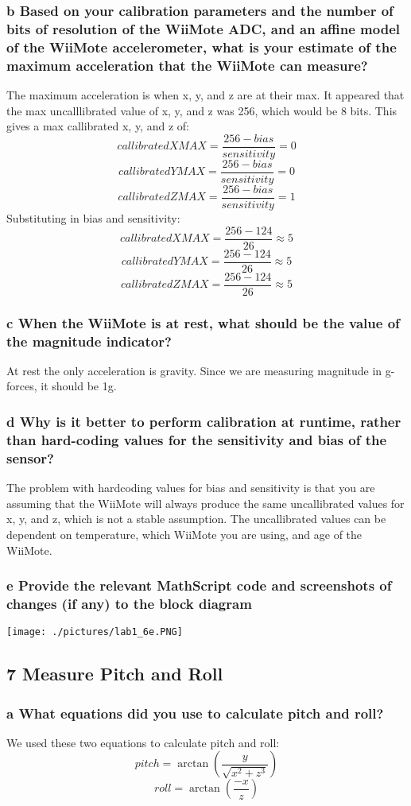 \documentclass[10pt,a4paper]{article}
\begin{document}
    \subsubsection*{b Based on your calibration parameters and the number of bits of resolution of the WiiMote ADC, and an affine model of the WiiMote accelerometer, what is your estimate of the maximum acceleration that the WiiMote can measure?}
      The maximum acceleration is when x, y, and z are at their max. It appeared that the max uncalllibrated value of x, y, and z was 256, which would be 8 bits. This gives a max callibrated x, y, and z of:
        \[callibratedXMAX = \frac{256 - bias}{sensitivity} = 0\] 
        \[callibratedYMAX = \frac{256 - bias}{sensitivity} = 0\] 
        \[callibratedZMAX = \frac{256 - bias}{sensitivity} = 1\]
      Substituting in bias and sensitivity:
        \[callibratedXMAX = \frac{256 - 124}{26} \approx 5\] 
        \[callibratedYMAX = \frac{256 - 124}{26} \approx 5\] 
        \[callibratedZMAX = \frac{256 - 124}{26} \approx 5\]
    \subsubsection*{c When the WiiMote is at rest, what should be the value of the magnitude indicator?}
      At rest the only acceleration is gravity. Since we are measuring magnitude in g-forces, it should be 1g. 
    \subsubsection*{d Why is it better to perform calibration at runtime, rather than hard-coding values for the sensitivity and bias of the sensor?}
      The problem with hardcoding values for bias and sensitivity is that you are assuming that the WiiMote will always produce the same uncallibrated values for x, y, and z, which is not a stable assumption. The uncallibrated values can be dependent on temperature, which WiiMote you are using, and age of the WiiMote. 
    \subsubsection*{e Provide the relevant MathScript code and screenshots of changes (if any) to the block diagram}
    \texttt{[image: ./pictures/lab1\_6e.PNG]} 
  \subsection*{7 Measure Pitch and Roll}
    \subsubsection*{a What equations did you use to calculate pitch and roll?}
      We used these two equations to calculate pitch and roll:
        \[pitch = \arctan(\frac{y}{\sqrt{x^2 + z^3}})\]
        \[roll = \arctan(\frac{-x}{z})\]
\end{document}
